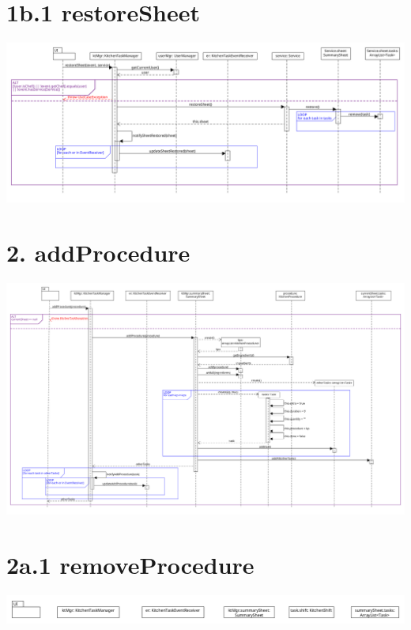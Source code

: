 \pagebreak

\section*{1b.1 restoreSheet}

\begin{center}
  \includegraphics[scale = 0.25]{images/DSD/DSD 1b.png}
\end{center}

\pagebreak

\section*{2. addProcedure}

\begin{center}
  \includegraphics[scale = 0.22]{images/DSD/DSD 2.png}
\end{center}

\pagebreak

\section*{2a.1 removeProcedure}

\begin{center}
  \includegraphics[scale = 0.25]{images/DSD/DSD 2a.png}
\end{center}

